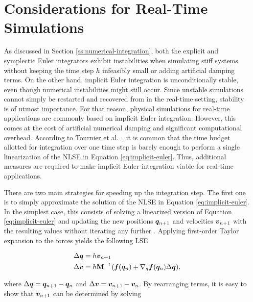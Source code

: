 \section{Considerations for Real-Time Simulations}\label{ss:numerical-integration-rt}
As discussed in Section \ref{ss:numerical-integration}, both the explicit and symplectic Euler integrators exhibit instabilities when simulating
stiff systems without keeping the time step $h$ infeasibly small or adding artificial damping terms. On the other hand, implicit Euler integration
is unconditionally stable, even though numerical instabilities might still occur. Since unstable simulations cannot simply be restarted and 
recovered from in the real-time setting, stability is of utmost importance. For that reason, physical simulations for real-time applications
are commonly based on implicit Euler integration. However, this comes at the cost of artificial numerical damping and significant computational
overhead. According to Tournier et al.\ \cite{tournier2015}, it is common that the time budget allotted for integration over one time step is 
barely enough to perform a single linearization of the NLSE in Equation \ref{eq:implicit-euler}. Thus, additional measures are required to make
implicit Euler integration viable for real-time applications. 

There are two main strategies for speeding up the integration step. The first one is to simply approximate the solution of the NLSE in
Equation \ref{eq:implicit-euler}. In the simplest case, this consists of solving a linearized version of Equation \ref{eq:implicit-euler} and updating 
the new positions $\bm{q}_{n+1}$ and velocities $\bm{v}_{n+1}$ with the resulting values without iterating any further \cite{baraff1998}. 
Applying first-order Taylor expansion to the forces yields the following LSE

\begin{equation}\label{eq:linear-implicit-lse}
    \begin{split}
    \Delta \bm{q} &= h \bm{v}_{n+1} \\
    \Delta \bm{v} &= h \mathbf{M}^{-1}(\bm{f}(\bm{q}_n) + \nabla_q \bm{f}(\bm{q}_n) \Delta \bm{q}),
    \end{split}
\end{equation}

\noindent where $\Delta \bm{q} = \bm{q}_{n+1} - \bm{q}_n$ and $\Delta \bm{v} = \bm{v}_{n+1} - \bm{v}_n$. By rearranging terms, it is 
easy to show that $\bm{v}_{n+1}$ can be determined by solving


